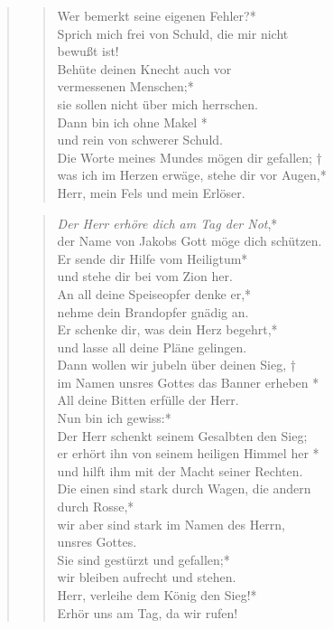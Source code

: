 \begin{quote}
\begin{verse}
Wer bemerkt seine eigenen Fehler?* \\ \vin
Sprich mich frei von Schuld, die mir nicht\\ \vin  bewußt ist!\\
Behüte deinen Knecht auch vor \\ vermessenen Menschen;*\\
sie sollen nicht über mich herrschen.\\ 
\vin Dann bin ich ohne Makel *\\ \vin und rein von schwerer Schuld.\\ 
Die Worte meines Mundes mögen dir gefallen; †\\ 
was ich im Herzen erwäge, stehe dir vor Augen,*\\ 
Herr, mein Fels und mein Erlöser.\\


\end{verse}

\begin{verse}


\smallskip
\textit{Der Herr erhöre dich am Tag der Not},*\\
der Name von Jakobs Gott möge dich schützen.\\ \vin
Er sende dir Hilfe vom Heiligtum*\\ \vin
und stehe dir bei vom Zion her.\\
An all deine Speiseopfer denke er,*\\
nehme dein Brandopfer gnädig an.\\ \vin
Er schenke dir, was dein Herz begehrt,*\\ \vin
und lasse all deine Pläne gelingen.\\
Dann wollen wir jubeln über deinen Sieg, †\\
im Namen unsres Gottes das Banner erheben *\\
All deine Bitten erfülle der Herr.\\ \vin
Nun bin ich gewiss:*\\ \vin Der Herr schenkt seinem Gesalbten den
Sieg;\\
er erhört ihn von seinem heiligen Himmel her *\\
und hilft ihm mit der Macht seiner Rechten.\\ \vin
Die einen sind stark durch Wagen, die andern\\ \vin durch Rosse,*\\ \vin
wir aber sind stark im Namen des Herrn,\\ \vin unsres Gottes.\\
Sie sind gestürzt und gefallen;*\\
wir bleiben aufrecht und stehen.\\ \vin
Herr, verleihe dem König den Sieg!*\\ \vin
Erhör uns am Tag, da wir rufen!\\


\end{verse}


\end{quote}